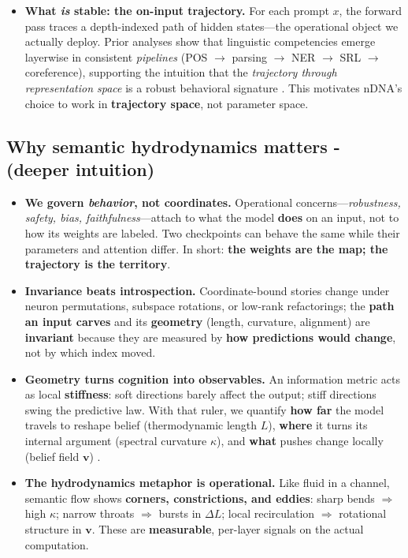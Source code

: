 \documentclass[11pt]{article}
\begin{document}
\begin{itemize}[leftmargin=*,itemsep=0.55em]
  \item \textbf{What \emph{is} stable: the on-input trajectory.}
  For each prompt \(x\), the forward pass traces a depth-indexed path of hidden states—the operational object we actually deploy. Prior analyses show that linguistic competencies emerge layerwise in consistent \emph{pipelines} (POS $\rightarrow$ parsing $\rightarrow$ NER $\rightarrow$ SRL $\rightarrow$ coreference), supporting the intuition that the \emph{trajectory through representation space} is a robust behavioral signature \citep{tenney2019bert,clark2019bert}. This motivates nDNA’s choice to work in \textbf{trajectory space}, not parameter space.

\end{itemize}


\medskip
\noindent
\subsection{Why semantic hydrodynamics matters - (deeper intuition)}
\begin{itemize}[leftmargin=*,itemsep=0.4em]
  \item \textbf{We govern \emph{behavior}, not coordinates.} Operational concerns---\emph{robustness, safety, bias, faithfulness}---attach to what the model \textbf{does} on an input, not to how its weights are labeled. Two checkpoints can behave the same while their parameters and attention differ. In short: \textbf{the weights are the map; the trajectory is the territory}.
  \item \textbf{Invariance beats introspection.} Coordinate-bound stories change under neuron permutations, subspace rotations, or low-rank refactorings; the \textbf{path an input carves} and its \textbf{geometry} (length, curvature, alignment) are \textbf{invariant} because they are measured by \textbf{how predictions would change}, not by which index moved.
  \item \textbf{Geometry turns cognition into observables.} An information metric acts as local \textbf{stiffness}: soft directions barely affect the output; stiff directions swing the predictive law. With that ruler, we quantify \textbf{how far} the model travels to reshape belief (thermodynamic length $L$), \textbf{where} it turns its internal argument (spectral curvature $\kappa$), and \textbf{what} pushes change locally (belief field $\mathbf{v}$) \citep{sivak2012thermodynamic,hyvarinen2005estimation}.
  \item \textbf{The hydrodynamics metaphor is operational.} Like fluid in a channel, semantic flow shows \textbf{corners, constrictions, and eddies}: sharp bends $\Rightarrow$ high $\kappa$; narrow throats $\Rightarrow$ bursts in $\Delta L$; local recirculation $\Rightarrow$ rotational structure in $\mathbf{v}$. These are \textbf{measurable}, per-layer signals on the actual computation.
\end{itemize}
\end{document}
